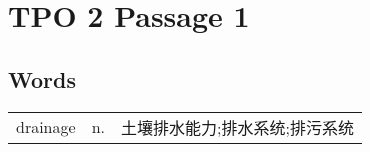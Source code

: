 \section{TPO 2 Passage 1}

\subsection{Words}

\begin{tabular}{lll}
    drainage & n. & 土壤排水能力;排水系统;排污系统 \\
\end{tabular}
